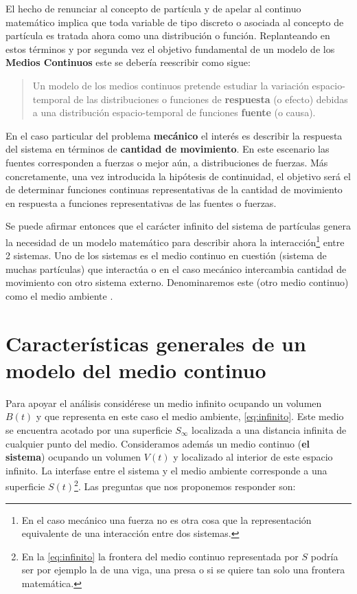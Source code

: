 \documentclass[../notas medios.tex]{subfiles}
\begin{document}
El hecho de renunciar al concepto de partícula y de apelar al continuo 
matemático implica que toda variable de tipo discreto o asociada al concepto de 
partícula es tratada ahora como una distribución o función.  Replanteando en 
estos términos y por segunda vez el objetivo fundamental de un modelo de los 
{\bf Medios Continuos} este se debería reescribir como sigue:
\begin{quote}
Un modelo de los medios continuos pretende estudiar la variación 
espacio-temporal de las distribuciones o funciones de {\bf respuesta} (o 
efecto) debidas a una distribución espacio-temporal de funciones {\bf fuente} 
(o causa).
\end{quote}

En el caso particular del problema {\bf mecánico} el interés es describir la
respuesta del sistema en términos de {\bf cantidad de movimiento}. En este 
escenario las fuentes corresponden a fuerzas o mejor aún, a distribuciones de 
fuerzas. Más concretamente, una vez introducida la hipótesis de continuidad, 
el objetivo será el de determinar funciones continuas representativas de la 
cantidad de movimiento en respuesta a funciones representativas de las fuentes 
o fuerzas.

Se puede afirmar entonces que el carácter infinito del sistema de partículas 
genera la necesidad de un modelo matemático para describir ahora la 
interacción\footnote{En el caso mecánico una fuerza no es otra cosa que la 
representación equivalente de una interacción entre dos sistemas.} entre 2 
sistemas. Uno de los sistemas es el medio continuo en cuestión (sistema de 
muchas partículas) que interactúa o en el caso mecánico intercambia cantidad de 
movimiento con otro sistema externo.  Denominaremos este (otro medio continuo) 
como el medio ambiente \cite{cadavid2009}.

\section{Características generales de un modelo del medio continuo}
Para apoyar el análisis considérese un medio infinito ocupando un volumen $B(t)$
y que representa en este caso el medio ambiente, \cref{eq:infinito}. Este medio 
se
encuentra acotado por una superficie ${S_\infty }$ localizada a una distancia 
infinita de cualquier punto del medio.  Consideramos además un medio continuo 
({\bf el sistema}) ocupando un volumen $V(t)$ y localizado al interior de este 
espacio infinito.  La interfase entre el sistema y el medio ambiente 
corresponde a una superficie $S(t)$\footnote{En la \cref{eq:infinito} la 
frontera 
del medio continuo representada por $S$ podría ser por ejemplo la de una viga, 
una presa o si se quiere tan solo una frontera matemática.}. Las preguntas que 
nos proponemos responder son:
\end{document}
